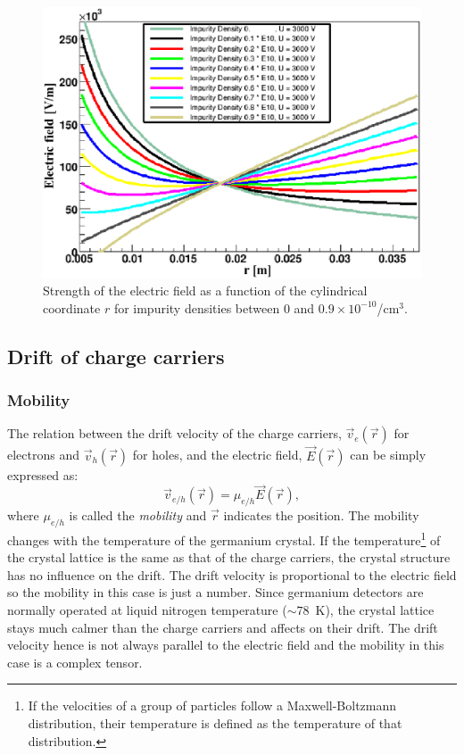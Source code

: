 \documentclass[epj]{svjour}
\begin{document}
\begin{figure}[htbp]
\centering
\includegraphics[width=\linewidth]{rho} 
\caption{Strength of the electric field as a function of the
cylindrical coordinate $r$ for impurity densities between 0 and $0.9
\times 10^{-10}$/cm$^{3}$.}
\label{f:rho} 
\end{figure} 

\subsection{Drift of charge carriers} 
\label{s:drift} 
\subsubsection{Mobility} 
\label{s:mobi} 
The relation between the drift velocity of the charge carriers,
$\vec{v}_{e}(\vec{r})$ for electrons and $\vec{v}_{h}(\vec{r})$ for
holes, and the electric field, $\vec{E}(\vec{r})$ can be simply
expressed as:
\begin{equation} 
\label{e:dv}
\vec{v}_{e/h} (\vec{r})= \mu_{e/h} \vec{E}(\vec{r}),
\end{equation}
where $\mu_{e/h}$ is called the \emph{mobility} and $\vec{r}$
indicates the position. The mobility changes with the temperature of
the germanium crystal. If the temperature\footnote{If the velocities
of a group of particles follow a Maxwell-Boltzmann distribution, their
temperature is defined as the temperature of that distribution.} of
the crystal lattice is the same as that of the charge carriers, the
crystal structure has no influence on the drift. The drift velocity is
proportional to the electric field so the mobility in this case is
just a number. Since germanium detectors are normally operated at
liquid nitrogen temperature ($\sim78$~K), the crystal lattice stays
much calmer than the charge carriers and affects on their drift. The
drift velocity hence is not always parallel to the electric field and
the mobility in this case is a complex tensor.
\end{document}
